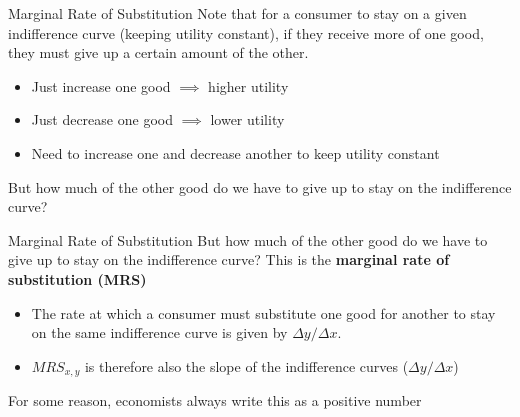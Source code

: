 \documentclass[11pt,t]{beamer}
\begin{document}
\begin{frame}{Marginal Rate of Substitution}
  Note that for a consumer to stay on a given indifference curve (keeping utility constant), if they receive more of one good, they must give up a certain amount of the other. 
  
  \pause\bigskip
  \begin{itemize}
    \item Just increase one good $\implies$ higher utility
    \item Just decrease one good $\implies$ lower utility
    \item Need to increase one and decrease another to keep utility constant
  \end{itemize}

  \pause\bigskip
  But how much of the other good do we have to give up to stay on the indifference curve?
\end{frame}

\begin{frame}{Marginal Rate of Substitution}
  But how much of the other good do we have to give up to stay on the indifference curve? This is the \textbf{marginal rate of substitution (MRS)}

  \begin{itemize}
    \item The rate at which a consumer must substitute one good for another to stay on the same indifference curve is given by $\Delta y / \Delta x$.

    \item $MRS_{x,y}$ is therefore also the slope of the indifference curves ($\Delta y / \Delta x$)
  \end{itemize}

  \bigskip
  For some reason, economists always write this as a positive number
\end{frame}
\end{document}
